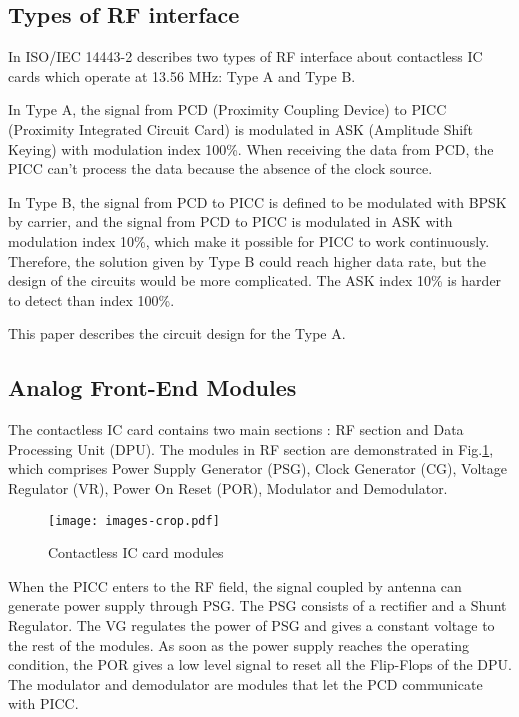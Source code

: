 \subsection{Types of RF interface}
In ISO/IEC 14443-2 describes two types of RF interface about contactless IC cards which operate at 13.56 MHz: Type A and Type B. 

In Type A, the signal from PCD (Proximity Coupling Device) to PICC (Proximity Integrated Circuit Card) is modulated in ASK (Amplitude Shift Keying) with modulation index 100\%. When receiving the data from PCD, the PICC can’t process the data because the absence of the clock source. 

In Type B,  the signal from PCD to PICC is defined to be modulated with BPSK by carrier, and the signal from PCD to PICC is modulated in ASK with modulation index 10\%, which make it possible for PICC to work continuously. Therefore, the solution given by Type B could reach higher data rate, but the design of the circuits would be more complicated. The ASK index 10\% is harder to detect than index 100\%.

This paper describes the circuit design for the Type A. 


\subsection{Analog Front-End Modules}

The contactless IC card contains two main sections \cite{rfid_interface}: RF section and Data Processing Unit (DPU). The modules in RF section are demonstrated in Fig.\ref{fig:modules}, which comprises Power Supply Generator (PSG), Clock Generator (CG), Voltage Regulator (VR), Power On Reset (POR), Modulator  and Demodulator. 

\begin{figure}[]
  \centering
  \texttt{[image: images-crop.pdf]}
  \caption{Contactless IC card modules}
  \label{fig:modules}
\end{figure}

When the PICC enters to the RF field, the signal coupled by antenna can generate power supply through PSG. The PSG consists of a rectifier and a Shunt Regulator. The VG regulates the power of PSG and gives a constant voltage to the rest of the modules. As soon as the power supply reaches the operating condition, the POR gives a low level signal to reset all the Flip-Flops of the DPU. The modulator and demodulator are modules that let the PCD communicate with PICC.